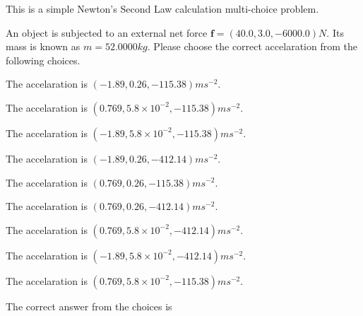 \documentclass[12pt]{article}
\begin{document}
  


\noindent{}
This is a simple Newton's Second Law calculation multi-choice problem.  
\noindent{}


 
 
An object is subjected to an external net force $\mathbf{f}=
(40.0 , 3.0 , -6000.0) N$.
Its mass is known as $m= %
52.0000 kg$. Please choose the
correct accelaration from the following choices.
 
 
 
The accelaration is $  %
(
-1.89,
0.26,
-115.38)
ms^{-2} $.
 
 
The accelaration is $  %
(
0.769,
5.8 \times 10^{-2},
-115.38)
ms^{-2} $.
 
 
The accelaration is $  %
(
-1.89,
5.8 \times 10^{-2},
-115.38)
ms^{-2} $.
 
 
The accelaration is $  %
(
-1.89,
0.26,
-412.14)
ms^{-2} $.
 
 
The accelaration is $  %
(
0.769,
0.26,
-115.38)
ms^{-2} $.
 
 
The accelaration is $  %
(
0.769,
0.26,
-412.14)
ms^{-2} $.
 
 
The accelaration is $  %
(
0.769,
5.8 \times 10^{-2},
-412.14)
ms^{-2} $.
 
 
The accelaration is $  %
(
-1.89,
5.8 \times 10^{-2},
-412.14)
ms^{-2} $.
 
 
\noindent{}
 
 
The accelaration is $  %
(
0.769,
5.8 \times 10^{-2},
-115.38)
ms^{-2} $.
 
 
\noindent{}
 
 
 
 
 
\noindent{}
 
 

The correct answer from the choices is
\end{document}

